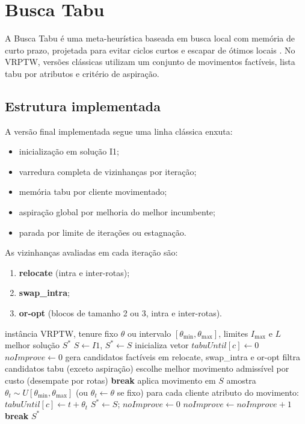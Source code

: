\section{Busca Tabu}
\label{sec:tabu}

A Busca Tabu é uma meta-heurística baseada em busca local com memória de curto prazo, projetada para evitar ciclos curtos e escapar de ótimos locais \cite{glover1989tabu,glover1990tabu,glover1997tabu}.
No VRPTW, versões clássicas utilizam um conjunto de movimentos factíveis, lista tabu por atributos e critério de aspiração.

\subsection{Estrutura implementada}

A versão final implementada segue uma linha clássica enxuta:
\begin{itemize}
  \item inicialização em solução I1;
  \item varredura completa de vizinhanças por iteração;
  \item memória tabu por cliente movimentado;
  \item aspiração global por melhoria do melhor incumbente;
  \item parada por limite de iterações ou estagnação.
\end{itemize}

As vizinhanças avaliadas em cada iteração são:
\begin{enumerate}
  \item \textbf{relocate} (intra e inter-rotas);
  \item \textbf{swap\_intra};
  \item \textbf{or-opt} (blocos de tamanho 2 ou 3, intra e inter-rotas).
\end{enumerate}

\begin{algorithm}[htbp]
\caption{Busca Tabu clássica (implementação final)}
\label{alg:tabu}
\begin{algorithmic}[1]
\Require instância VRPTW, tenure fixo $\theta$ ou intervalo $[\theta_{\min},\theta_{\max}]$, limites $I_{\max}$ e $L$
\Ensure melhor solução $S^*$
\State $S \leftarrow I1$, $S^* \leftarrow S$
\State inicializa vetor $tabuUntil[c] \leftarrow 0$
\State $noImprove \leftarrow 0$
  \State gera candidatos factíveis em relocate, swap\_intra e or-opt
  \State filtra candidatos tabu (exceto aspiração)
  \State escolhe melhor movimento admissível por custo (desempate por rotas)
    \State \textbf{break}
  \EndIf
  \State aplica movimento em $S$
  \State amostra $\theta_t \sim U[\theta_{\min},\theta_{\max}]$ (ou $\theta_t \leftarrow \theta$ se fixo)
  \State para cada cliente atributo do movimento: $tabuUntil[c] \leftarrow t + \theta_t$
    \State $S^* \leftarrow S$; $noImprove \leftarrow 0$
  \Else
    \State $noImprove \leftarrow noImprove + 1$
  \EndIf
    \State \textbf{break}
  \EndIf
\EndFor
\State \Return $S^*$
\end{algorithmic}
\end{algorithm}

